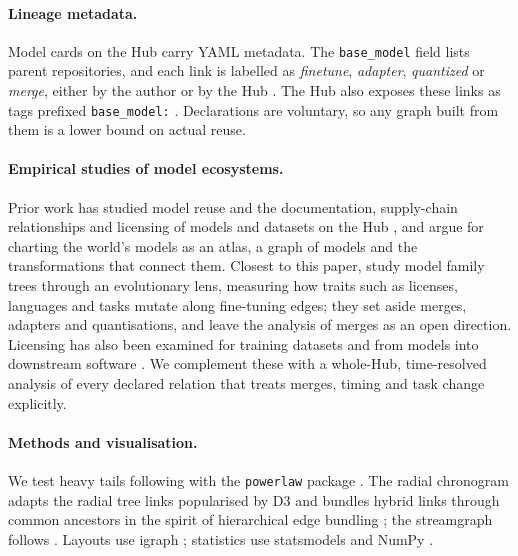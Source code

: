 \documentclass[11pt]{article}
\begin{document}
\paragraph{Lineage metadata.} Model cards on the Hub carry YAML metadata. The \texttt{base\_model} field lists parent repositories, and each link is labelled as \emph{finetune}, \emph{adapter}, \emph{quantized} or \emph{merge}, either by the author or by the Hub \citep{hfdocs}. The Hub also exposes these links as tags prefixed \texttt{base\_model:} \citep{laufer2025}. Declarations are voluntary, so any graph built from them is a lower bound on actual reuse.

\paragraph{Empirical studies of model ecosystems.} Prior work has studied model reuse \citep{jiang2023} and the documentation, supply-chain relationships and licensing of models and datasets on the Hub \citep{stalnaker2026}, and \citet{horwitz2025} argue for charting the world's models as an atlas, a graph of models and the transformations that connect them. Closest to this paper, \citet{laufer2025} study model family trees through an evolutionary lens, measuring how traits such as licenses, languages and tasks mutate along fine-tuning edges; they set aside merges, adapters and quantisations, and leave the analysis of merges as an open direction. Licensing has also been examined for training datasets \citep{longpre2024} and from models into downstream software \citep{jewitt2025}. We complement these with a whole-Hub, time-resolved analysis of every declared relation that treats merges, timing and task change explicitly.

\paragraph{Methods and visualisation.} We test heavy tails following \citet{clauset2009} with the \texttt{powerlaw} package \citep{alstott2014}. The radial chronogram adapts the radial tree links popularised by D3 \citep{bostock2011} and bundles hybrid links through common ancestors in the spirit of hierarchical edge bundling \citep{holten2006}; the streamgraph follows \citet{byron2008}. Layouts use igraph \citep{csardi2006}; statistics use statsmodels \citep{seabold2010} and NumPy \citep{harris2020}.
\end{document}
